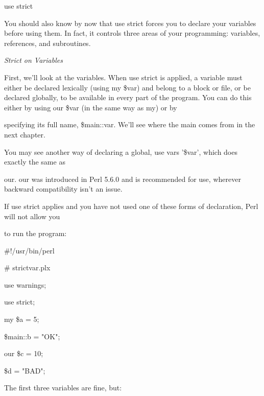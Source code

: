 \documentclass[a4paper,11pt]{book}
\begin{document}
\noindent 

\noindent 

\noindent use strict

\noindent 

\noindent You should also know by now that use strict forces you to declare your variables before using them. In fact, it controls three areas of your programming: variables, references, and subroutines.

\noindent 

\noindent \textit{Strict on Variables}

\noindent First, we'll look at the variables. When use strict is applied, a variable must either be declared lexically (using my \$var) and belong to a block or file, or be declared globally, to be available in every part of the program. You can do this either by using our \$var (in the same way as my) or by

\noindent specifying its full name, \$main::var. We'll see where the main comes from in the next chapter.

\noindent 

\noindent 

\noindent You may see another way of declaring a global, use vars '\$var', which does exactly the same as

\noindent our. our was introduced in Perl 5.6.0 and is recommended for use, wherever backward compatibility isn't an issue.

\noindent 

\noindent If use strict applies and you have not used one of these forms of declaration, Perl will not allow you

\noindent to run the program:

\noindent 

\noindent \#!/usr/bin/perl

\noindent \# strictvar.plx

\noindent use warnings;

\noindent use strict;

\noindent 

\noindent my \$a = 5;

\noindent \$main::b = "OK";

\noindent our \$c = 10;

\noindent \$d = "BAD";

\noindent 

\noindent The first three variables are fine, but:

\noindent 
\end{document}
